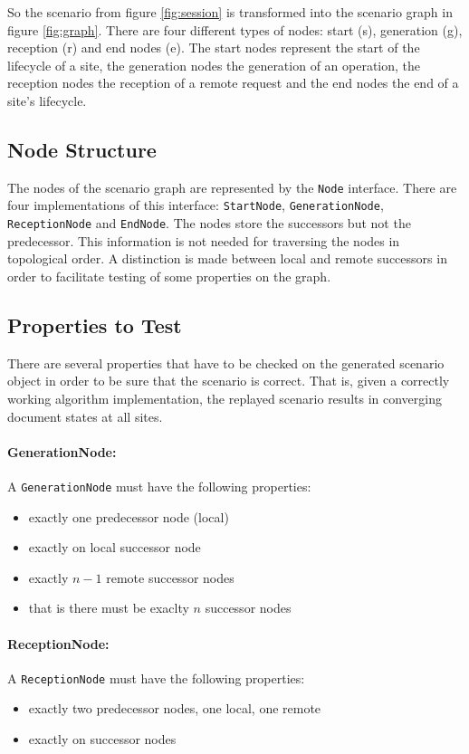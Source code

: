 \documentclass[11pt,a4paper]{article}
\begin{document}
So the scenario from figure \ref{fig:session} is transformed into the scenario graph in figure \ref{fig:graph}. There are four different types of nodes: start (s), generation (g), reception (r) and end nodes (e). The start nodes represent the start of the lifecycle of a site, the generation nodes the generation of an operation, the reception nodes the reception of a remote request and the end nodes the end of a site's lifecycle. 


\subsection{Node Structure}
The nodes of the scenario graph are represented by the \texttt{Node} interface. There are four implementations of this interface: \texttt{StartNode}, \texttt{GenerationNode}, \texttt{ReceptionNode} and \texttt{EndNode}. The nodes store the successors but not the predecessor. This information is not needed for traversing the nodes in topological order. A distinction is made between local and remote successors in order to facilitate testing of some properties on the graph.


\subsection{Properties to Test}
There are several properties that have to be checked on the generated scenario object in order to be sure that the scenario is correct. That is, given a correctly working algorithm implementation, the replayed scenario results in converging document states at all sites.

\paragraph{GenerationNode:}
A \texttt{GenerationNode} must have the following properties:
\begin{itemize}
 \item exactly one predecessor node (local)
 \item exactly on local successor node
 \item exactly $n - 1$ remote successor nodes
 \item that is there must be exaclty $n$ successor nodes
\end{itemize}

\paragraph{ReceptionNode:}
A \texttt{ReceptionNode} must have the following properties:
\begin{itemize}
 \item exactly two predecessor nodes, one local, one remote
 \item exactly on successor nodes
\end{itemize}
\end{document}
